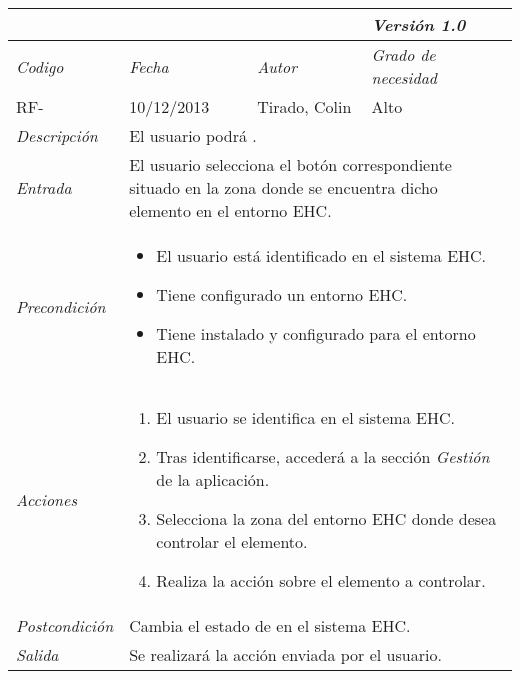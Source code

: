 \begin{tabular}{|p{3cm}|p{3cm}|p{3cm}|p{3cm}|}
    \hline
    \multicolumn{3}{|p{9cm}|}{\textit{}} & \textit{Versi\'on 1.0} \\
    \hline
    \textit{Codigo} & \textit{Fecha} & \textit{Autor} & \textit{Grado de necesidad} \\
    RF- & 10/12/2013 & Tirado, Colin & Alto \\
    \hline
    \textit{Descripci\'on} & \multicolumn{3}{|p{9cm}|}{El usuario podr\'a .} \\
    \hline
    \textit{Entrada} & \multicolumn{3}{|p{9cm}|}{El usuario selecciona el bot\'on correspondiente situado en la zona donde se encuentra dicho elemento en el entorno EHC.} \\
    \hline
    \textit{Precondici\'on} & \multicolumn{3}{|p{9cm}|}{
        \begin{itemize}
            \item El usuario est\'a identificado en el sistema EHC.
            \item Tiene configurado un entorno EHC.
            \item Tiene instalado y configurado para el entorno EHC.
        \end{itemize}
    } \\
    \hline
    \textit{Acciones} & \multicolumn{3}{|p{9cm}|}{
        \begin{enumerate}
            \item El usuario se identifica en el sistema EHC.
            \item Tras identificarse, acceder\'a a la secci\'on \textit{Gesti\'on} de la aplicaci\'on.
            \item Selecciona la zona del entorno EHC donde desea controlar el elemento.
            \item Realiza la acci\'on sobre el elemento a controlar.
        \end{enumerate}
    } \\
    \hline
    \textit{Postcondici\'on} & \multicolumn{3}{|p{9cm}|}{Cambia el estado de  en el sistema EHC.} \\
    \hline
    \textit{Salida} & \multicolumn{3}{|p{9cm}|}{Se realizar\'a la acci\'on enviada por el usuario.} \\ \hline
\end{tabular}
